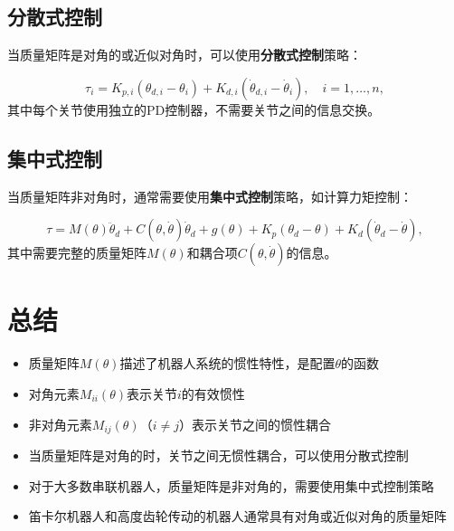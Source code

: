 \documentclass{article}
\begin{document}
\subsection{分散式控制}

当质量矩阵是对角的或近似对角时，可以使用\textbf{分散式控制}策略：

\begin{equation}
\tau_i = K_{p,i}(\theta_{d,i} - \theta_i) + K_{d,i}(\dot{\theta}_{d,i} - \dot{\theta}_i), \quad i = 1, \ldots, n,
\end{equation}
其中每个关节使用独立的PD控制器，不需要关节之间的信息交换。

\subsection{集中式控制}

当质量矩阵非对角时，通常需要使用\textbf{集中式控制}策略，如计算力矩控制：

\begin{equation}
\tau = M(\theta)\ddot{\theta}_d + C(\theta, \dot{\theta})\dot{\theta}_d + g(\theta) + K_p(\theta_d - \theta) + K_d(\dot{\theta}_d - \dot{\theta}),
\end{equation}
其中需要完整的质量矩阵$M(\theta)$和耦合项$C(\theta, \dot{\theta})$的信息。

\section{总结}

\begin{itemize}
\item 质量矩阵$M(\theta)$描述了机器人系统的惯性特性，是配置$\theta$的函数
\item 对角元素$M_{ii}(\theta)$表示关节$i$的有效惯性
\item 非对角元素$M_{ij}(\theta)$（$i \neq j$）表示关节之间的惯性耦合
\item 当质量矩阵是对角的时，关节之间无惯性耦合，可以使用分散式控制
\item 对于大多数串联机器人，质量矩阵是非对角的，需要使用集中式控制策略
\item 笛卡尔机器人和高度齿轮传动的机器人通常具有对角或近似对角的质量矩阵
\end{itemize}
\end{document}
